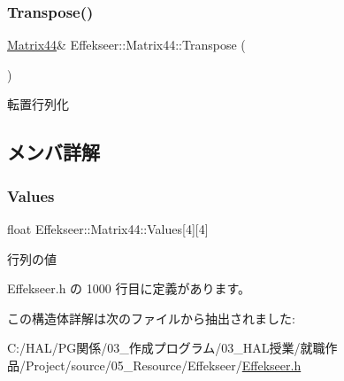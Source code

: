 \subsubsection{\texorpdfstring{Transpose()}{Transpose()}}
{\footnotesize\ttfamily \mbox{\hyperlink{struct_effekseer_1_1_matrix44}{Matrix44}}\& Effekseer\+::\+Matrix44\+::\+Transpose (\begin{DoxyParamCaption}{ }\end{DoxyParamCaption})}



転置行列化 



\subsection{メンバ詳解}
\mbox{\label{struct_effekseer_1_1_matrix44_ac747413302e165521317a399db929313}} 
\subsubsection{\texorpdfstring{Values}{Values}}
{\footnotesize\ttfamily float Effekseer\+::\+Matrix44\+::\+Values\mbox{[}4\mbox{]}\mbox{[}4\mbox{]}}



行列の値 



 Effekseer.\+h の 1000 行目に定義があります。



この構造体詳解は次のファイルから抽出されました\+:\begin{DoxyCompactItemize}
\item 
C\+:/\+H\+A\+L/\+P\+G関係/03\+\_\+作成プログラム/03\+\_\+\+H\+A\+L授業/就職作品/\+Project/source/05\+\_\+\+Resource/\+Effekseer/\mbox{\hyperlink{_effekseer_8h}{Effekseer.\+h}}\end{DoxyCompactItemize}
